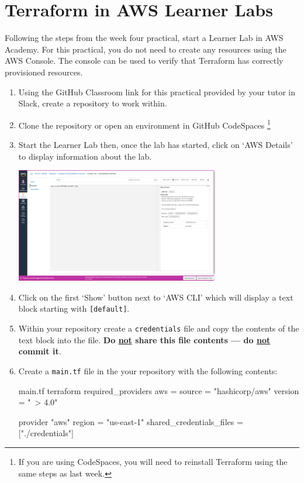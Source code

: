 \documentclass{csse4400}
\begin{document}
\section{Terraform in AWS Learner Labs}
Following the steps from the week four practical,
start a Learner Lab in AWS Academy.
For this practical,
you do not need to create any resources using the AWS Console.
The console can be used to verify that Terraform has correctly provisioned resources.

\begin{enumerate}
\item Using the GitHub Classroom link for this practical provided by your tutor in Slack,
    create a repository to work within.
\item Clone the repository or open an environment in GitHub CodeSpaces%
\footnote{If you are using CodeSpaces, you will need to reinstall Terraform using the same steps as last week.}
\item Start the Learner Lab then, once the lab has started,
    click on `AWS Details' to display information about the lab.

\includegraphics[width=0.7\textwidth]{images/aws-details}

\item Click on the first `Show' button next to `AWS CLI' which will display a text block starting with \texttt{[default]}.
\item Within your repository create a \texttt{credentials} file and copy the contents of the text block into the file.
    \textbf{Do \underline{not} share this file contents --- do \underline{not} commit it}.
\item Create a \texttt{main.tf} file in the your repository with the following contents:
\begin{code}[language=terraform,numbers=none]{main.tf}
terraform {
    required_providers {
        aws = {
            source  = "hashicorp/aws"
            version = "~> 4.0"
        }
    }
}

provider "aws" {
    region = "us-east-1"
    shared_credentials_files = ["./credentials"]
}
\end{code}


\end{enumerate}
\end{document}
